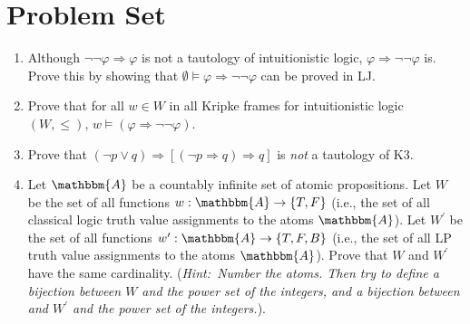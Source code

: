 \documentclass[11pt]{article}
\theoremstyle{definition}
\theoremstyle{remark}
\begin{document}
\section*{Problem Set}

\begin{enumerate}
    \item Although $\neg\neg\varphi\Rightarrow\varphi$ is not a tautology of intuitionistic logic, $\varphi\Rightarrow\neg\neg\varphi$ is. Prove this by showing that $\emptyset\vDash\varphi\Rightarrow\neg\neg\varphi$ can be proved in LJ.

    \item Prove that for all $w\in W$ in all Kripke frames for intuitionistic logic $(W,\leq)$, $w\vDash(\varphi\Rightarrow\neg\neg\varphi)$.

    \item Prove that $(\neg p \vee q)\Rightarrow [(\neg p\Rightarrow q)\Rightarrow q]$ is \textit{not} a tautology of K3. 

    \item Let $\mathbbm{A}$ be a countably infinite set of atomic propositions. Let $W$ be the set of all functions $w:\mathbbm{A}\rightarrow\{T,F\}$ (i.e., the set of all classical logic truth value assignments to the atoms $\mathbbm{A}$). Let $W^{\prime}$ be the set of all functions $w^{\prime}:\mathbbm{A}\rightarrow\{T,F,B\}$ (i.e., the set of all LP truth value assignments to the atoms $\mathbbm{A}$). Prove that $W$ and $W^{\prime}$ have the same cardinality. (\textit{Hint:\ Number the atoms. Then try to define a bijection between $W$ and the power set of the integers, and a bijection between and $W^{\prime}$ and the power set of the integers.}).
\end{enumerate}
\end{document}
